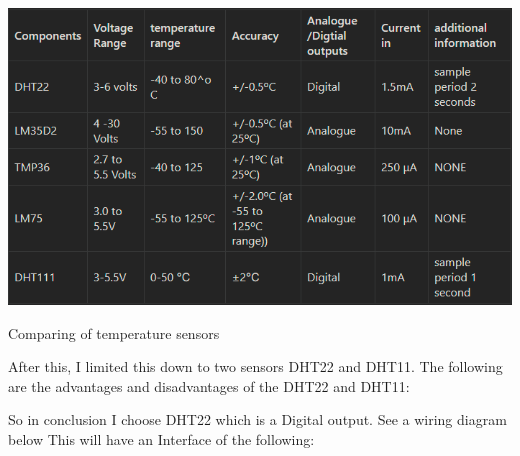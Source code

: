 \begin{table}[h!]
	\centering
	\includegraphics[width=0.5\linewidth]{Images/tempssenorscompared.png}
	\caption{Comparing of temperature sensors}
	\label{Comparing of temperature sensors}
\end{table}
After this, I limited this down to two sensors DHT22 and DHT11. The  following are the advantages and disadvantages of the DHT22 and DHT11:
\begin{table}[h!]
	\centering
	\caption{Comparing DHT22 and DHT11}
	\label{Compareing DHT22 and DHT11}

\end{table}
So in conclusion I choose DHT22 which is a  Digital output. See a wiring diagram below
This will have an Interface of the following:

